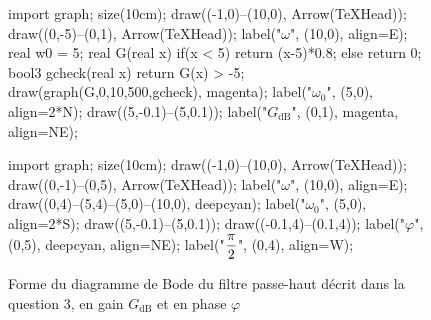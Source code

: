 \documentclass[a4paper]{article}
\begin{document}
	\begin{figure}[H]
		\centering
		\begin{asy}
			import graph;
			size(10cm);
			draw((-1,0)--(10,0), Arrow(TeXHead));
			draw((0,-5)--(0,1), Arrow(TeXHead));
			label("$\omega$", (10,0), align=E);
			real w0 = 5;
			real G(real x) {
				if(x < 5) {
					return (x-5)*0.8;
				} else {
					return 0;
				}
			}
			bool3 gcheck(real x) { return G(x) > -5; }
			draw(graph(G,0,10,500,gcheck), magenta);
			label("$\omega_0$", (5,0), align=2*N);
			draw((5,-0.1)--(5,0.1));
			label("$G_\text{dB}$", (0,1), magenta, align=NE);
		\end{asy}

		\bigskip

		\begin{asy}
			import graph;
			size(10cm);
			draw((-1,0)--(10,0), Arrow(TeXHead));
			draw((0,-1)--(0,5), Arrow(TeXHead));
			label("$\omega$", (10,0), align=E);
			draw((0,4)--(5,4)--(5,0)--(10,0), deepcyan);
			label("$\omega_0$", (5,0), align=2*S);
			draw((5,-0.1)--(5,0.1));
			draw((-0.1,4)--(0.1,4));
			label("$\varphi$", (0,5), deepcyan, align=NE);
			label("$\displaystyle\frac\pi2$", (0,4), align=W);
		\end{asy}
		\caption{Forme du diagramme de {\sc Bode}\/ du filtre passe-haut décrit dans la question 3, en gain $G_\text{dB}$\/ et en phase $\varphi$}
	\end{figure}
\end{document}
